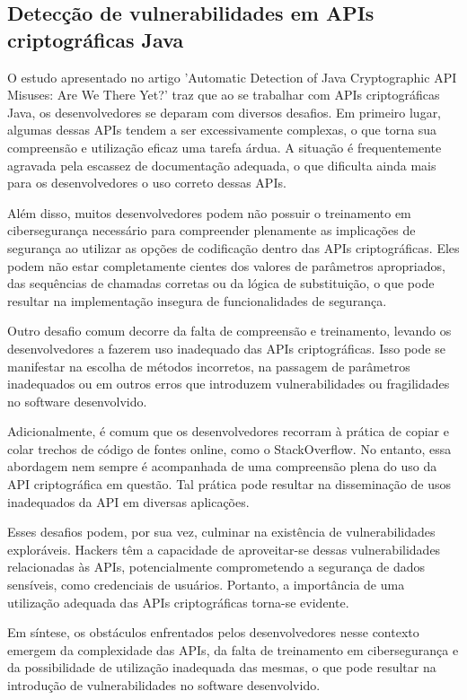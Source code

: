 \subsection{Detecção de vulnerabilidades em APIs criptográficas Java} %

O estudo apresentado no artigo 'Automatic Detection of Java Cryptographic API Misuses: Are We There Yet?' traz que ao se trabalhar com APIs criptográficas Java, os desenvolvedores se deparam com diversos desafios. Em primeiro lugar, algumas dessas APIs tendem a ser excessivamente complexas, o que torna sua compreensão e utilização eficaz uma tarefa árdua. A situação é frequentemente agravada pela escassez de documentação adequada, o que dificulta ainda mais para os desenvolvedores o uso correto dessas APIs.

Além disso, muitos desenvolvedores podem não possuir o treinamento em cibersegurança necessário para compreender plenamente as implicações de segurança ao utilizar as opções de codificação dentro das APIs criptográficas. Eles podem não estar completamente cientes dos valores de parâmetros apropriados, das sequências de chamadas corretas ou da lógica de substituição, o que pode resultar na implementação insegura de funcionalidades de segurança.

Outro desafio comum decorre da falta de compreensão e treinamento, levando os desenvolvedores a fazerem uso inadequado das APIs criptográficas. Isso pode se manifestar na escolha de métodos incorretos, na passagem de parâmetros inadequados ou em outros erros que introduzem vulnerabilidades ou fragilidades no software desenvolvido.

Adicionalmente, é comum que os desenvolvedores recorram à prática de copiar e colar trechos de código de fontes online, como o StackOverflow. No entanto, essa abordagem nem sempre é acompanhada de uma compreensão plena do uso da API criptográfica em questão. Tal prática pode resultar na disseminação de usos inadequados da API em diversas aplicações.

Esses desafios podem, por sua vez, culminar na existência de vulnerabilidades exploráveis. Hackers têm a capacidade de aproveitar-se dessas vulnerabilidades relacionadas às APIs, potencialmente comprometendo a segurança de dados sensíveis, como credenciais de usuários. Portanto, a importância de uma utilização adequada das APIs criptográficas torna-se evidente.

Em síntese, os obstáculos enfrentados pelos desenvolvedores nesse contexto emergem da complexidade das APIs, da falta de treinamento em cibersegurança e da possibilidade de utilização inadequada das mesmas, o que pode resultar na introdução de vulnerabilidades no software desenvolvido.

